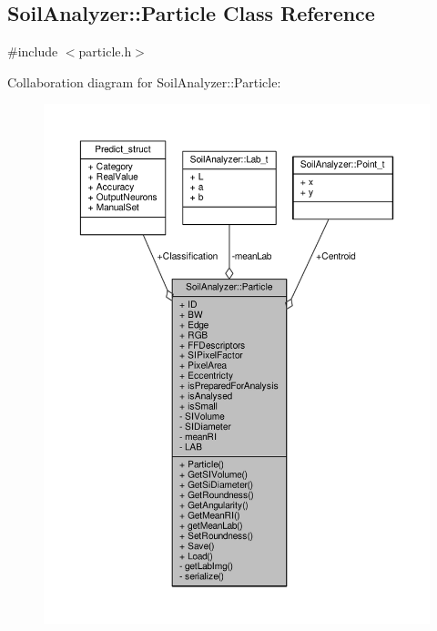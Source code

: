 \hypertarget{class_soil_analyzer_1_1_particle}{}\subsection{Soil\+Analyzer\+:\+:Particle Class Reference}
\label{class_soil_analyzer_1_1_particle}


{\ttfamily \#include $<$particle.\+h$>$}



Collaboration diagram for Soil\+Analyzer\+:\+:Particle\+:
\nopagebreak
\begin{figure}[H]
\begin{center}
\leavevmode
\includegraphics[width=350pt]{class_soil_analyzer_1_1_particle__coll__graph}
\end{center}
\end{figure}
